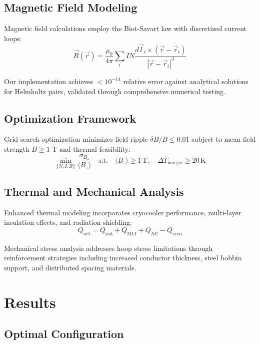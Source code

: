 \documentclass[10pt,twocolumn]{article}
\begin{document}
\subsection{Magnetic Field Modeling}

Magnetic field calculations employ the Biot-Savart law with discretized current loops:
\begin{equation}
\vec{B}(\vec{r}) = \frac{\mu_0}{4\pi} \sum_{i} I N \frac{d\vec{l}_i \times (\vec{r} - \vec{r}_i)}{|\vec{r} - \vec{r}_i|^3}
\end{equation}

Our implementation achieves $<10^{-14}$ relative error against analytical solutions for Helmholtz pairs, validated through comprehensive numerical testing.

\subsection{Optimization Framework}

Grid search optimization minimizes field ripple $\delta B / B \leq 0.01$ subject to mean field strength $B \geq 1$ T and thermal feasibility:
\begin{equation}
\min_{\{N,I,R\}} \frac{\sigma_{B_z}}{\langle B_z \rangle} \quad \text{s.t.} \quad \langle B_z \rangle \geq 1\,\text{T}, \quad \Delta T_{\text{margin}} \geq 20\,\text{K}
\end{equation}

\subsection{Thermal and Mechanical Analysis}

Enhanced thermal modeling incorporates cryocooler performance, multi-layer insulation effects, and radiation shielding:
\begin{equation}
Q_{\text{net}} = Q_{\text{rad}} + Q_{\text{MLI}} + Q_{\text{AC}} - Q_{\text{cryo}}
\end{equation}

Mechanical stress analysis addresses hoop stress limitations through reinforcement strategies including increased conductor thickness, steel bobbin support, and distributed spacing materials.

\section{Results}

\subsection{Optimal Configuration}
\end{document}
